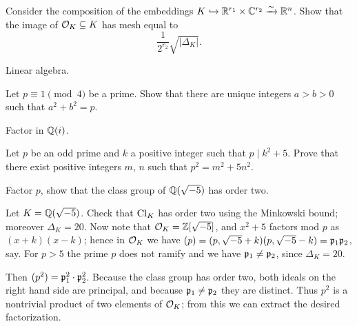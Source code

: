 \begin{problem} 
	\label{prob:OK_linalg}
	Consider the composition of the embeddings $K \hookrightarrow \mathbb R^{r_1} \times \mathbb C^{r_2} \xrightarrow{\sim} \mathbb R^n$.
	Show that the image of $\mathcal O_K \subseteq K$ has mesh equal to
	\[ \frac{1}{2^{r_2}} \sqrt{\left\lvert \Delta_K \right\rvert}. \]
	\begin{hint}
		Linear algebra.
	\end{hint}
\end{problem}

\begin{problem}
	Let $p \equiv 1 \pmod 4$ be a prime.
	Show that there are unique integers $a > b > 0$ such that $a^2+b^2=p$.
	\begin{hint}
		Factor in $\mathbb Q(i)$.
	\end{hint}
\end{problem}


\begin{problem}
	[Korea 2014]
	Let $p$ be an odd prime and $k$ a positive integer such that $p \mid k^2+5$.
	Prove that there exist positive integers $m$, $n$ such that $p^2 = m^2+5n^2$.
	\begin{hint}
		Factor $p$, show that the class group of $\mathbb Q(\sqrt{-5})$ has order two.
	\end{hint}
	\begin{sol}
		Let $K = \mathbb Q(\sqrt{-5})$. Check that $\mathrm{Cl}_K$ has order two using the Minkowski bound;
		moreover $\Delta_K = 20$.
		Now note that $\mathcal O_K = \mathbb Z[\sqrt{-5}]$, and $x^2+5$ factors mod $p$ as $(x+k)(x-k)$;
		hence in $\mathcal O_K$ we have $(p) = (p, \sqrt{-5}+k)(p, \sqrt{-5}-k) = \mathfrak p_1 \mathfrak p_2$, say.
		For $p > 5$ the prime $p$ does not ramify and we have $\mathfrak p_1 \neq \mathfrak p_2$, since $\Delta_K = 20$.

		Then $(p^2) = \mathfrak p_1^2 \cdot \mathfrak p_2^2$. Because the class group has order two,
		both ideals on the right hand side are principal, and because $\mathfrak p_1 \neq \mathfrak p_2$ they are distinct.
		Thus $p^2$ is a nontrivial product of two elements of $\mathcal O_K$; from this we can extract the desired factorization.
	\end{sol}
\end{problem}
